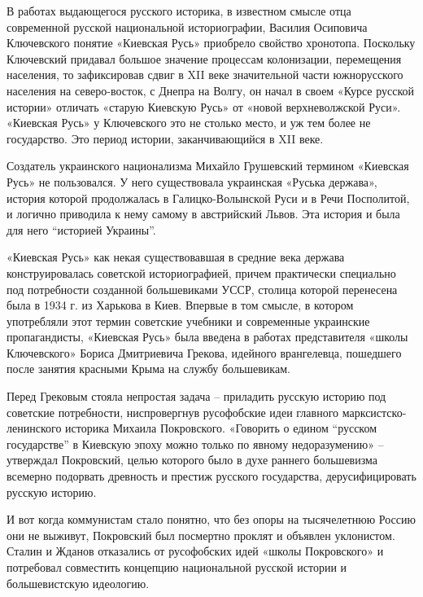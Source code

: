 В работах выдающегося русского историка, в известном смысле отца современной
русской национальной историографии, Василия Осиповича Ключевского понятие
«Киевская Русь» приобрело свойство хронотопа. Поскольку Ключевский придавал
большое значение процессам колонизации, перемещения населения, то зафиксировав
сдвиг в XII веке значительной части южнорусского населения на северо-восток, с
Днепра на Волгу, он начал в своем «Курсе русской истории» отличать «старую
Киевскую Русь» от «новой верхневолжской Руси». «Киевская Русь» у Ключевского
это не столько место, и уж тем более не государство. Это период истории,
заканчивающийся в XII веке.


Создатель украинского национализма Михайло Грушевский термином «Киевская Русь»
не пользовался. У него существовала украинская «Руська держава», история
которой продолжалась в Галицко-Волынской Руси и в Речи Посполитой, и логично
приводила к нему самому в австрийский Львов. Эта история и была для него
\enquote{историей Украины}.

«Киевская Русь» как некая существовавшая в средние века держава
конструировалась советской историографией, причем практически специально под
потребности созданной большевиками УССР, столица которой перенесена была в 1934
г. из Харькова в Киев. Впервые в том смысле, в котором употребляли этот термин
советские учебники и современные украинские пропагандисты, «Киевская Русь» была
введена в работах представителя «школы Ключевского» Бориса Дмитриевича Грекова,
идейного врангелевца, пошедшего после занятия красными Крыма на службу
большевикам.


Перед Грековым стояла непростая задача – приладить русскую историю под
советские потребности, ниспровергнув русофобские идеи главного
марксистско-ленинского историка Михаила Покровского. «Говорить о едином
\enquote{русском государстве} в Киевскую эпоху можно только по явному недоразумению» –
утверждал Покровский, целью которого было в духе раннего большевизма всемерно
подорвать древность и престиж русского государства, дерусифицировать русскую
историю.

И вот когда коммунистам стало понятно, что без опоры на тысячелетнюю Россию они
не выживут, Покровский был посмертно проклят и объявлен уклонистом. Сталин и
Жданов отказались от русофобских идей «школы Покровского» и потребовал
совместить концепцию национальной русской истории и большевистскую идеологию.

